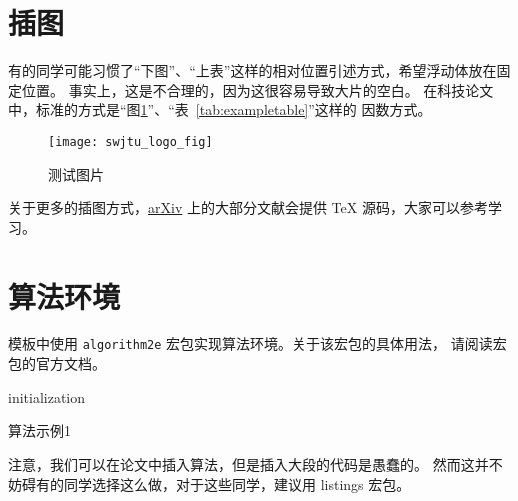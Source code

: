 \section{插图}

有的同学可能习惯了“下图”、“上表”这样的相对位置引述方式，希望浮动体放在固定位置。
事实上，这是不合理的，因为这很容易导致大片的空白。
在科技论文中，标准的方式是“图\ref{fig:logo}”、“表~\ref{tab:exampletable}”这样的
因数方式。
\begin{figure}[htbp]
\centering
\texttt{[image: swjtu\_logo\_fig]}
\caption{测试图片}
\label{fig:logo}
\end{figure}

关于更多的插图方式，\href{https://arxiv.org}{arXiv} 上的大部分文献会提供 \TeX{}
源码，大家可以参考学习。



\section{算法环境}

模板中使用 \texttt{algorithm2e} 宏包实现算法环境。关于该宏包的具体用法，
请阅读宏包的官方文档。

\begin{algorithm}[htbp]
\small
\SetAlgoLined
{}

initialization\;
\caption{算法示例1}
\label{algo:algorithm1}
\end{algorithm}

注意，我们可以在论文中插入算法，但是插入大段的代码是愚蠢的。
然而这并不妨碍有的同学选择这么做，对于这些同学，建议用 \textsf{listings} 宏包。

